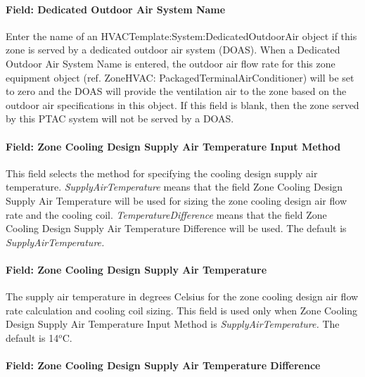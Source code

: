 \paragraph{Field: Dedicated Outdoor Air System Name}\label{field-dedicated-outdoor-air-system-name-2}

Enter the name of an HVACTemplate:System:DedicatedOutdoorAir object if this zone is served by a dedicated outdoor air system (DOAS). When a Dedicated Outdoor Air System Name is entered, the outdoor air flow rate for this zone equipment object (ref. ZoneHVAC: PackagedTerminalAirConditioner) will be set to zero and the DOAS will provide the ventilation air to the zone based on the outdoor air specifications in this object. If this field is blank, then the zone served by this PTAC system will not be served by a DOAS.

\paragraph{Field: Zone Cooling Design Supply Air Temperature Input Method}\label{field-zone-cooling-design-supply-air-temperature-input-method-1}

This field selects the method for specifying the cooling design supply air temperature. \emph{SupplyAirTemperature} means that the field Zone Cooling Design Supply Air Temperature will be used for sizing the zone cooling design air flow rate and the cooling coil. \emph{TemperatureDifference} means that the field Zone Cooling Design Supply Air Temperature Difference will be used. The default is \emph{SupplyAirTemperature.}

\paragraph{Field: Zone Cooling Design Supply Air Temperature}\label{field-zone-cooling-design-supply-air-temperature-000}

The supply air temperature in degrees Celsius for the zone cooling design air flow rate calculation and cooling coil sizing. This field is used only when Zone Cooling Design Supply Air Temperature Input Method is \emph{SupplyAirTemperature.} The default is 14\(^{o}\)C.

\paragraph{Field: Zone Cooling Design Supply Air Temperature Difference}\label{field-zone-cooling-design-supply-air-temperature-difference-1}

